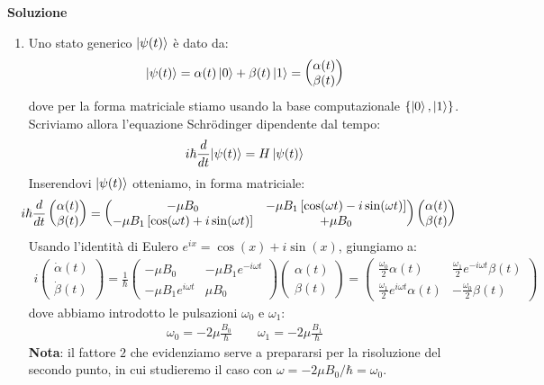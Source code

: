 \documentclass[../../InformazioneQuantistica.tex]{subfiles}
\begin{document}
\textbf{Soluzione}
\begin{enumerate}
\item Uno stato generico $\Ket{\psi(t)}$ è dato da:
\begin{align}
\Ket{\psi(t)} = \alpha(t) \Ket{0} + \beta(t) \Ket{1} = \begin{pmatrix}
\alpha(t)\\
\beta(t)
\end{pmatrix}
\label{eqn:generic-psi}
\end{align}
dove per la forma matriciale stiamo usando la base computazionale $\{\Ket{0},\Ket{1}\}$.\\
Scriviamo allora l'equazione Schr\"odinger dipendente dal tempo:
\begin{align*}
i\hbar \frac{d}{dt}{\Ket{\psi(t)}} = H\Ket{\psi(t)}
\end{align*}
Inserendovi $\Ket{\psi(t)}$
otteniamo, in forma matriciale:
\begin{align*}\hspace{-1em}
i\hbar \frac{d}{dt}\begin{pmatrix}\alpha(t)\\ \beta(t) \end{pmatrix} = \begin{pmatrix} -\mu B_0 & -\mu B_1 \left[\cos(\omega t)-i\sin(\omega t)\right]\\
-\mu B_1\left[ \cos(\omega t) + i\sin(\omega t)\right] & +\mu B_0\end{pmatrix} \begin{pmatrix}
\alpha(t)\\
\beta(t) \end{pmatrix}
\end{align*}
Usando l'identità di Eulero $e^{ix}=\cos(x)+i\sin(x)$, giungiamo a:
\begin{align*}
i\begin{pmatrix}
\dot{\alpha}(t)\\
\dot{\beta}(t)
\end{pmatrix}
=\frac{1}{\hbar}\begin{pmatrix}
-\mu B_0 & -\mu B_1 e^{-i\omega t}\\
-\mu B_1 e^{i\omega t} & \mu B_0
\end{pmatrix}\begin{pmatrix}\alpha(t)\\\beta(t)\end{pmatrix} =\begin{pmatrix}
\frac{\omega_0}{2} \alpha(t) & \frac{\omega_1}{2}e^{-i\omega t}\beta(t)\\
\frac{\omega_1}{2}e^{i\omega t} \alpha(t) & -\frac{\omega_0}{2}\beta(t)
\end{pmatrix}
\end{align*}
dove abbiamo introdotto le pulsazioni $\omega_0$ e $\omega_1$:
\begin{align}\label{eqn:pulsazioni}
\omega_0 = -2\mu\frac{B_0}{\hbar} \qquad \omega_1 = -2\mu \frac{B_1}{\hbar}
\end{align}
\textbf{Nota}: il fattore $2$ che evidenziamo serve a prepararsi per la risoluzione del secondo punto, in cui studieremo il caso con $\omega = -2\mu B_0/\hbar = \omega_0$.\\


\end{enumerate}
\end{document}

